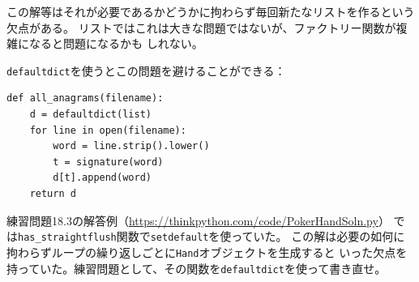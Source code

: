 \documentclass[a4j,12pt,makeidx]{jbook}
\begin{document}
この解等はそれが必要であるかどうかに拘わらず毎回新たなリストを作るという欠点がある。
リストではこれは大きな問題ではないが、ファクトリー関数が複雑になると問題になるかも
しれない。\par
{\tt defaultdict}を使うとこの問題を避けることができる：
\begin{verbatim}
def all_anagrams(filename):
    d = defaultdict(list)
    for line in open(filename):
        word = line.strip().lower()
        t = signature(word)
        d[t].append(word)
    return d
\end{verbatim}
練習問題18.3の解答例（\url{https://thinkpython.com/code/PokerHandSoln.py}）
では{\tt has\_straightflush}関数で{\tt setdefault}を使っていた。
この解は必要の如何に拘わらずループの繰り返しごとに{\tt Hand}オブジェクトを生成すると
いった欠点を持っていた。練習問題として、その関数を{\tt defaultdict}を使って書き直せ。
%
\end{document}
